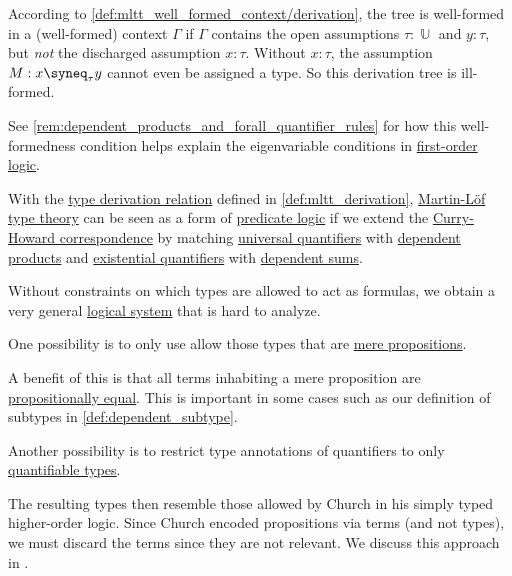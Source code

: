 \begin{example}
\begin{thmenum}
    According to \cref{def:mltt_well_formed_context/derivation}, the tree is well-formed in a (well-formed) context \( \Gamma \) if \( \Gamma \) contains the open assumptions \( \tau: \BbbU \) and \( y: \tau \), but \emph{not} the discharged assumption \( x: \tau \). Without \( x: \tau \), the assumption \( M: x \syneq_{\tau} y \) cannot even be assigned a type. So this derivation tree is ill-formed.

    See \cref{rem:dependent_products_and_forall_quantifier_rules} for how this well-formedness condition helps explain the eigenvariable conditions in \hyperref[def:first_order_logic]{first-order logic}.
  \end{thmenum}
\end{example}

\begin{remark}\label{rem:mltt_curry_howard}
  With the \hyperref[def:type_derivation_relation]{type derivation relation} defined in \cref{def:mltt_derivation}, \hyperref[def:martin_lof_type_theory]{Martin-L\"of type theory} can be seen as a form of \hyperref[con:predicate_logic]{predicate logic} if we extend the \hyperref[con:curry_howard_correspondence]{Curry-Howard correspondence} by matching \hyperref[def:predicate_logic_alphabet/quantifiers/universal]{universal quantifiers} with \hyperref[def:dependent_product]{dependent products} and \hyperref[def:predicate_logic_alphabet/quantifiers/existential]{existential quantifiers} with \hyperref[def:dependent_sum]{dependent sums}.

  \begin{thmenum}
     Without constraints on which types are allowed to act as formulas, we obtain a very general \hyperref[con:logical_system]{logical system} that is hard to analyze.

     One possibility is to only use allow those types that are \hyperref[def:mere_proposition]{mere propositions}.

    A benefit of this is that all terms inhabiting a mere proposition are \hyperref[def:mltt_propositional_equality]{propositionally equal}. This is important in some cases such as our definition of subtypes in \cref{def:dependent_subtype}.

     Another possibility is to restrict type annotations of quantifiers to only \hyperref[def:quantifiable_type]{quantifiable types}.

    The resulting types then resemble those allowed by Church in his simply typed higher-order logic. Since Church encoded propositions via terms (and not types), we must discard the terms since they are not relevant. We discuss this approach in .
  \end{thmenum}
\end{remark}

